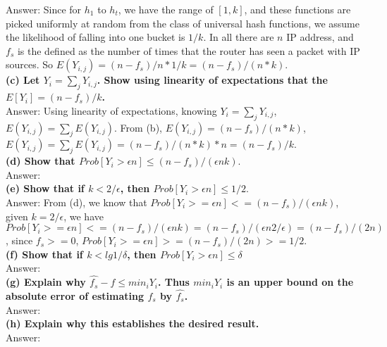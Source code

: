 \documentclass{article}
\begin{document}
Answer: Since for $h_1$ to $h_t$, we have the range of $[1,k]$, and these functions are picked uniformly at random from the class of universal hash functions, we assume the likelihood of falling into one bucket is $1/k$. In all there are $n$ IP address, and $f_s$ is the defined as the number of times that the router has seen a packet with IP sources. So $E(Y_{i,j}) =(n-f_s)/n * 1/k = (n-f_s)/(n*k)$.\\ \newline
\textbf{(c) Let $Y_i = \sum_jY_{i,j}$. Show using linearity of expectations that the $E[Y_i] = (n - f_s)/k$.} \\ \newline
Answer: Using linearity of expectations, knowing $Y_i = \sum_{j} Y_{i,j}$, $E(Y_{i,j}) =  \sum_{j} E(Y_{i,j})$. From (b), $E(Y_{i,j}) = (n-f_s)/(n*k)$,  $E(Y_{i,j}) =  \sum_{j} E(Y_{i,j}) =(n-f_s)/(n*k) * n =  (n-f_s)/k$.\\ \newline
\textbf{(d) Show that $Prob[Y_i > \epsilon n] \leq (n - f_s)/(\epsilon nk)$}. \\ \newline
Answer: \\ \newline
\textbf{(e) Show that if $k < 2/\epsilon$, then $Prob[Y_i > \epsilon n] \leq 1/2$}. \\ \newline
Answer: From (d), we know that $Prob[Y_i>=\epsilon n] <= (n-f_s)/(\epsilon nk)$, given $k = 2/\epsilon$, we have $Prob[Y_i>=\epsilon n] <= (n-f_s)/(\epsilon nk) = (n-f_s)/(\epsilon n 2/\epsilon) = (n-f_s)/(2n)$, since $f_s>=0$,  $Prob[Y_i>=\epsilon n] > = (n-f_s)/(2n) >=1/2$.\\ \newline
\textbf{(f) Show that if $k < lg1/\delta$, then $Prob[Y_i > \epsilon n] \leq \delta$} \\ \newline
Answer: \\ \newline
\textbf{(g) Explain why $\hat{f_{s}} - f \leq min_i Y_i$. Thus $min_i Y_i$ is an upper bound on the absolute error of estimating $f_s$ by $\hat{f_{s}}$.} \\ \newline
Answer: \\ \newline
\textbf{(h) Explain why this establishes the desired result.} \\ \newline
Answer:\\ \newline
\end{document}
